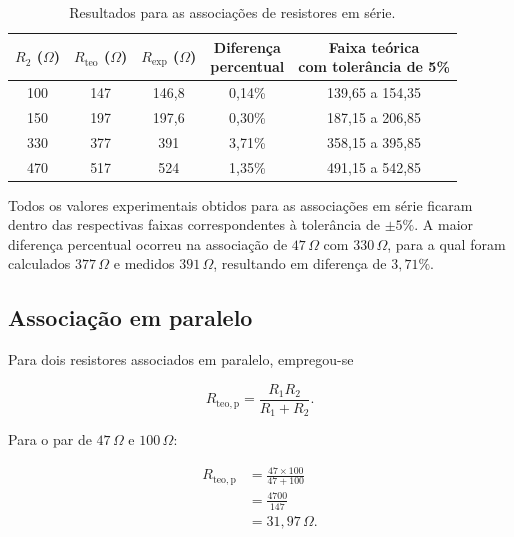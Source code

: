 \documentclass[a4paper,12pt]{article}
\begin{document}
\begin{table}[H]
  \centering
  \caption{Resultados para as associações de resistores em série.}
  \label{tab:serie}
  \medskip

  \footnotesize
  \setlength{\tabcolsep}{4pt}
  \begin{tabular}{ccccc}
    \toprule
    \shortstack{$R_2$\\($\Omega$)}
    & \shortstack{$R_{\mathrm{teo}}$\\($\Omega$)}
    & \shortstack{$R_{\mathrm{exp}}$\\($\Omega$)}
    & \shortstack{\textbf{Diferença}\\\textbf{percentual}}
    & \shortstack{\textbf{Faixa teórica}\\\textbf{com tolerância de 5\%}} \\
    \midrule
    100 & 147 & 146,8 & 0,14\% & 139,65 a 154,35 \\
    150 & 197 & 197,6 & 0,30\% & 187,15 a 206,85 \\
    330 & 377 & 391   & 3,71\% & 358,15 a 395,85 \\
    470 & 517 & 524   & 1,35\% & 491,15 a 542,85 \\
    \bottomrule
  \end{tabular}
\end{table}

Todos os valores experimentais obtidos para as associações em série ficaram
dentro das respectivas faixas correspondentes à tolerância de $\pm5\%$. A maior
diferença percentual ocorreu na associação de $47\,\Omega$ com $330\,\Omega$,
para a qual foram calculados $377\,\Omega$ e medidos $391\,\Omega$, resultando
em diferença de $3{,}71\%$.

\subsection{Associação em paralelo}

Para dois resistores associados em paralelo, empregou-se

\[
  R_{\mathrm{teo,p}}
  =
  \frac{R_1R_2}{R_1+R_2}.
\]

Para o par de $47\,\Omega$ e $100\,\Omega$:

\[
\begin{aligned}
R_{\mathrm{teo,p}}
  &=
  \frac{47\times100}{47+100}\\
  &=
  \frac{4700}{147}\\
  &=31{,}97\,\Omega.
\end{aligned}
\]
\end{document}
